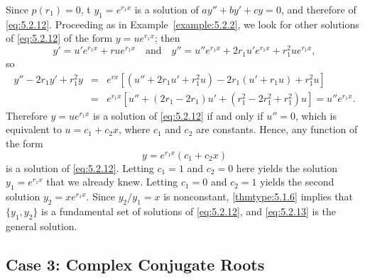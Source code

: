 \documentclass{ximera}
\begin{document}
Since $p(r_1)=0$, t $y_1=e^{r_1x}$ is a solution of
$ay''+by'+cy=0$, and therefore of \eqref{eq:5.2.12}. Proceeding as in
Example~\ref{example:5.2.2}, we look for other solutions of \eqref{eq:5.2.12}
of the form $y=ue^{r_1x}$; then
$$
y'=u'e^{r_1x}+rue^{r_1x}\quad\mbox{and}\quad
y''=u''e^{r_1x}+2r_1u'e^{r_1x}+r_1^2ue^{r_1x},
$$
so
\begin{eqnarray*}
y''-2r_1y'+r_1^2y&=&e^{rx}\left[(u''+2r_1u'+r_1^2u)-
2r_1(u'+r_1u)+r_1^2u\right]\\
&=&e^{r_1x}\left[u''+(2r_1-2r_1)u'+(r_1^2-2r_1^2+r_1^2)u\right]=u''e^{r_1x}.
\end{eqnarray*}
Therefore $y=ue^{r_1x}$ is a solution of \eqref{eq:5.2.12} if and only if
$u''=0$, which is equivalent to $u=c_1+c_2x$, where $c_1$ and $c_2$
are constants. Hence, any function of the form
\begin{equation} \label{eq:5.2.13}
y=e^{r_1x}(c_1+c_2x)
\end{equation}
is  a solution of \eqref{eq:5.2.12}.
Letting $c_1=1$ and $c_2=0$ here yields the solution
 $y_1=e^{r_1x}$ that we already knew. Letting $c_1=0$ and $c_2=1$
yields the second solution $y_2=xe^{r_1x}$. Since
$y_2/y_1=x$
is nonconstant, \ref{thmtype:5.1.6} implies that   $\{y_1,y_2\}$ is
a fundamental set of solutions of \eqref{eq:5.2.12}, and \eqref{eq:5.2.13}
is the general solution.
 
 
\subsection*{Case 3: Complex Conjugate Roots}
 
\end{document}
